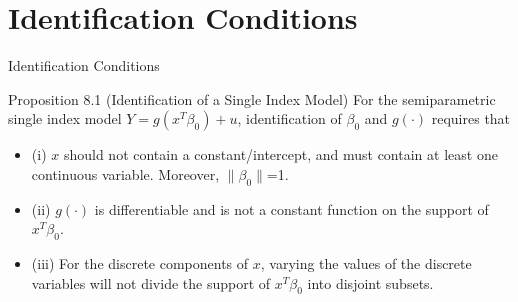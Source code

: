 \documentclass[xcolor=svgnames,dvipdfmx,cjk]{beamer}
\theoremstyle{example}
\begin{document}
\section{Identification Conditions}
\begin{frame}
  \tableofcontents[currentsection]
\end{frame}

\begin{frame}{Identification Conditions}
  \begin{itembox}[l]{Proposition 8.1 (Identification of a Single Index Model)}
    \quad 
    For the semiparametric single index model $Y = g(x^{T} \beta_0) + u$,
    identification of $\beta_0$ and $g(\cdot)$ requires that
    \begin{itemize}
      \item (i)
            $x$ should not contain a constant/intercept, 
            and must contain at least one continuous variable.
            Moreover, $\|\beta_0\|$=1.
      \item (ii)
            $g(\cdot)$ is differentiable 
            and is not a constant function on the support of $x^{T}\beta_0$.
      \item (iii)
            For the discrete components of $x$, 
            varying the values of the discrete variables will not divide the support of $x^{T}\beta_0$ into disjoint subsets.
    \end{itemize}
  \end{itembox}
\end{frame}
\end{document}
